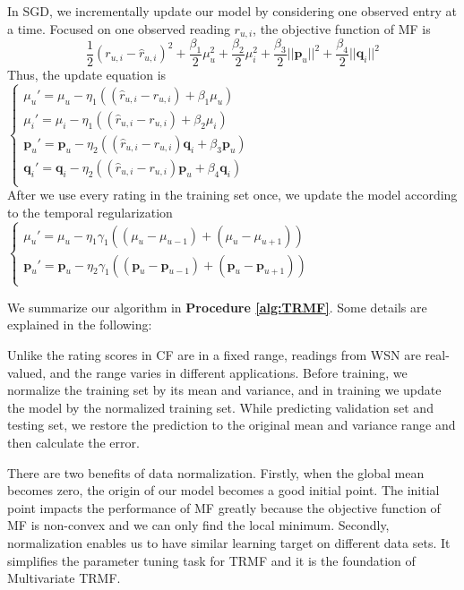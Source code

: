 In SGD, we incrementally update our model by considering one observed entry at a time. Focused on one observed reading $r_{u,i}$, the objective function of MF is
\begin{equation*} \frac{1}{2}(r_{u,i} - \hat{r}_{u,i})^2 + \frac{\beta_1}{2}\mu_u^2 + \frac{\beta_2}{2}\mu_i^2 + \frac{\beta_3}{2}||\mathbf{p}_u||^2 + \frac{\beta_4}{2}||\mathbf{q}_i||^2\end{equation*}
Thus, the update equation is\\
$\begin{cases}
	\mu_u' = \mu_u - \eta_1 ((\hat{r}_{u,i}-r_{u,i}) + \beta_1 \mu_u) \\
	\mu_i' = \mu_i - \eta_1 ((\hat{r}_{u,i}-r_{u,i}) + \beta_2 \mu_i) \\
	\mathbf{p}_{u}' = \mathbf{p}_{u} - \eta_2 ((\hat{r}_{u,i}-r_{u,i})\mathbf{q}_{i} + \beta_3 \mathbf{p}_{u})\\
	\mathbf{q}_{i}' = \mathbf{q}_{i} - \eta_2 ((\hat{r}_{u,i}-r_{u,i})\mathbf{p}_{u} + \beta_4 \mathbf{q}_{i})\\
\end{cases}$\\
After we use every rating in the training set once, we update the model according to the temporal regularization
$\begin{cases}
	\mu_u' = \mu_u - \eta_1 \gamma_1((\mu_u-\mu_{u-1})+(\mu_u-\mu_{u+1}))\\
	\mathbf{p}_{u}' = \mathbf{p}_{u} - \eta_2 \gamma_1((\mathbf{p}_{u}-\mathbf{p}_{u-1})+(\mathbf{p}_{u}-\mathbf{p}_{u+1}))\\
\end{cases}$

We summarize our algorithm in \textbf{Procedure \ref{alg:TRMF}}. Some details are explained in the following:


Unlike the rating scores in CF are in a fixed range, readings from WSN are real-valued, and the range varies in different applications. Before training, we normalize the training set by its mean and variance, and in training we update the model by the normalized training set. While predicting validation set and testing set, we restore the prediction to the original mean and variance range and then calculate the error.

There are two benefits of data normalization. Firstly, when the global mean becomes zero, the origin of our model becomes a good initial point. The initial point impacts the performance of MF greatly because the objective function of MF is non-convex and we can only find the local minimum. Secondly, normalization enables us to have similar learning target on different data sets. It simplifies the parameter tuning task for TRMF and it is the foundation of Multivariate TRMF. 


